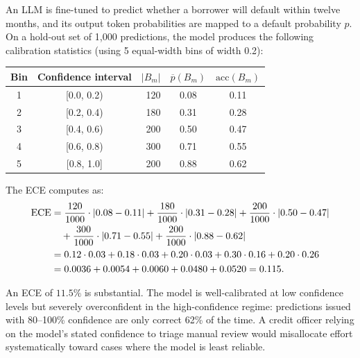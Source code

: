 \begin{example}
\label{ex:ch13-ece-credit}
An LLM is fine-tuned to predict whether a borrower will default within twelve months,
and its output token probabilities are mapped to a default probability $\hat{p}$. On a
hold-out set of 1{,}000 predictions, the model produces the following calibration
statistics (using 5 equal-width bins of width 0.2):

\begin{center}
\begin{tabular}{ccrcc}
\hline
Bin & Confidence interval & $|B_m|$ & $\overline{p}(B_m)$ & $\text{acc}(B_m)$ \\
\hline
1 & [0.0, 0.2) & 120 & 0.08 & 0.11 \\
2 & [0.2, 0.4) & 180 & 0.31 & 0.28 \\
3 & [0.4, 0.6) & 200 & 0.50 & 0.47 \\
4 & [0.6, 0.8) & 300 & 0.71 & 0.55 \\
5 & [0.8, 1.0] & 200 & 0.88 & 0.62 \\
\hline
\end{tabular}
\end{center}

The ECE computes as:
\begin{align}
  \text{ECE} &= \frac{120}{1000}\cdot|0.08-0.11| + \frac{180}{1000}\cdot|0.31-0.28|
               + \frac{200}{1000}\cdot|0.50-0.47| \notag \\
             &\quad + \frac{300}{1000}\cdot|0.71-0.55| + \frac{200}{1000}\cdot|0.88-0.62|
               \notag \\
             &= 0.12 \cdot 0.03 + 0.18 \cdot 0.03 + 0.20 \cdot 0.03 + 0.30 \cdot 0.16
               + 0.20 \cdot 0.26 \notag \\
             &= 0.0036 + 0.0054 + 0.0060 + 0.0480 + 0.0520 = 0.115.
\end{align}

An ECE of $11.5\%$ is substantial. The model is well-calibrated at low confidence levels
but severely overconfident in the high-confidence regime: predictions issued with
80--100\% confidence are only correct 62\% of the time. A credit officer relying on
the model's stated confidence to triage manual review would misallocate effort
systematically toward cases where the model is least reliable.
\end{example}

